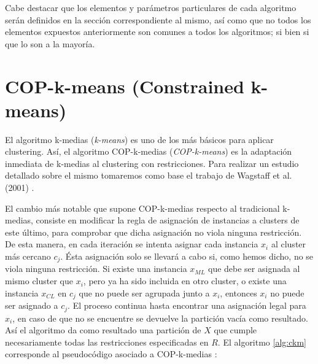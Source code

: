 Cabe destacar que los elementos y parámetros particulares de cada algoritmo serán definidos en la sección correspondiente al mismo, así como que no todos los elementos expuestos anteriormente son comunes a todos los algoritmos; si bien si que lo son a la mayoría.

\section{COP-k-means (Constrained k-means)}

El algoritmo k-medias (\textit{k-means}) es uno de los más básicos para aplicar clustering. Así, el algoritmo COP-k-medias (\textit{COP-k-means}) es la adaptación inmediata de k-medias al clustering con restricciones. Para realizar un estudio detallado sobre el mismo tomaremos como base el trabajo de Wagstaff et al. (2001) \cite{Wagstaff:2001b}.

El cambio más notable que supone COP-k-medias respecto al tradicional k-medias, consiste en modificar la regla de asignación de instancias a clusters de este último, para comprobar que dicha asignación no viola ninguna restricción. De esta manera, en cada iteración se intenta asignar cada instancia $x_i$ al cluster más cercano $c_j$. Ésta asignación solo se llevará a cabo si, como hemos dicho, no se viola ninguna restricción. Si existe una instancia $x_{ML}$ que debe ser asignada al mismo cluster que $x_i$, pero ya ha sido incluida en otro cluster, o existe una instancia $x_{CL}$ en $c_j$ que no puede ser agrupada junto a $x_i$, entonces $x_i$ no puede ser asignado a $c_j$. El proceso continua hasta encontrar una asignación legal para $x_i$, en caso de que no se encuentre se devuelve la partición vacía como resultado. Así el algoritmo da como resultado una partición de $X$ que cumple necesariamente todas las restricciones especificadas en $R$. El algoritmo \ref{alg:ckm} corresponde al pseudocódigo asociado a COP-k-medias \cite{Wagstaff:2001b}:


